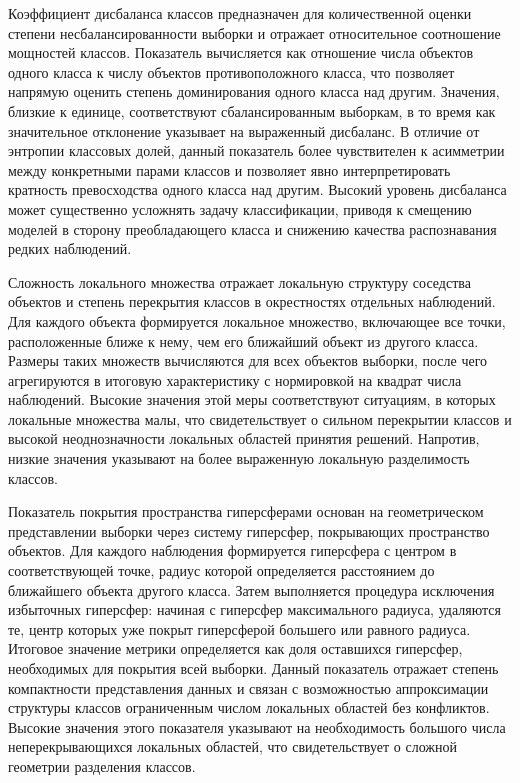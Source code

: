 \documentclass[specification,annotation,times]{itmo-student-thesis}
\begin{document}
Коэффициент дисбаланса классов предназначен для количественной оценки степени несбалансированности выборки и отражает относительное соотношение мощностей классов. Показатель вычисляется как отношение числа объектов одного класса к числу объектов противоположного класса, что позволяет напрямую оценить степень доминирования одного класса над другим. Значения, близкие к единице, соответствуют сбалансированным выборкам, в то время как значительное отклонение указывает на выраженный дисбаланс. В отличие от энтропии классовых долей, данный показатель более чувствителен к асимметрии между конкретными парами классов и позволяет явно интерпретировать кратность превосходства одного класса над другим. Высокий уровень дисбаланса может существенно усложнять задачу классификации, приводя к смещению моделей в сторону преобладающего класса и снижению качества распознавания редких наблюдений.

Сложность локального множества отражает локальную структуру соседства объектов и степень перекрытия классов в окрестностях отдельных наблюдений. Для каждого объекта формируется локальное множество, включающее все точки, расположенные ближе к нему, чем его ближайший объект из другого класса. Размеры таких множеств вычисляются для всех объектов выборки, после чего агрегируются в итоговую характеристику с нормировкой на квадрат числа наблюдений. Высокие значения этой меры соответствуют ситуациям, в которых локальные множества малы, что свидетельствует о сильном перекрытии классов и высокой неоднозначности локальных областей принятия решений. Напротив, низкие значения указывают на более выраженную локальную разделимость классов. 

Показатель покрытия пространства гиперсферами основан на геометрическом представлении выборки через систему гиперсфер, покрывающих пространство объектов. Для каждого наблюдения формируется гиперсфера с центром в соответствующей точке, радиус которой определяется расстоянием до ближайшего объекта другого класса. Затем выполняется процедура исключения избыточных гиперсфер: начиная с гиперсфер максимального радиуса, удаляются те, центр которых уже покрыт гиперсферой большего или равного радиуса. Итоговое значение метрики определяется как доля оставшихся гиперсфер, необходимых для покрытия всей выборки. Данный показатель отражает степень компактности представления данных и связан с возможностью аппроксимации структуры классов ограниченным числом локальных областей без конфликтов. Высокие значения этого показателя указывают на необходимость большого числа неперекрывающихся локальных областей, что свидетельствует о сложной геометрии разделения классов.
\end{document}
